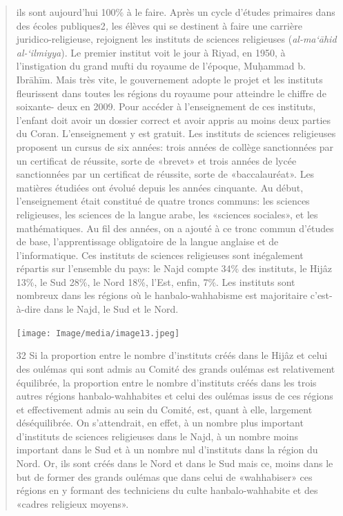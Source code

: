 \begin{quote}
ils sont aujourd'hui 100\% à le faire. Après un cycle d'études primaires
dans des écoles publiques2\emph{,} les élèves qui se destinent à faire
une carrière juridico-religieuse, rejoignent les instituts de sciences
religieuses (\emph{al-ma`āhid al-`ilmiyya}). Le premier institut voit le
jour à Riyad, en 1950, à l'instigation du grand mufti du royaume de
l'époque, Muḥammad b. Ibrāhīm. Mais très vite, le gouvernement adopte le
projet et les instituts fleurissent dans toutes les régions du royaume
pour atteindre le chiffre de soixante- deux en 2009. Pour accéder à
l'enseignement de ces instituts, l'enfant doit avoir un dossier correct
et avoir appris au moins deux parties du Coran. L'enseignement y est
gratuit. Les instituts de sciences religieuses proposent un cursus de
six années: trois années de collège sanctionnées par un certificat de
réussite, sorte de «brevet» et trois années de lycée sanctionnées par un
certificat de réussite, sorte de «baccalauréat». Les matières étudiées
ont évolué depuis les années cinquante. Au début, l'enseignement était
constitué de quatre troncs communs: les sciences religieuses, les
sciences de la langue arabe, les «sciences sociales», et les
mathématiques. Au fil des années, on a ajouté à ce tronc commun d'études
de base, l'apprentissage obligatoire de la langue anglaise et de
l'informatique. Ces instituts de sciences religieuses sont inégalement
répartis sur l'ensemble du pays: le Najd compte 34\% des instituts, le
Hijâz 13\%, le Sud 28\%, le Nord 18\%, l'Est, enfin, 7\%. Les instituts
sont nombreux dans les régions où le hanbalo-wahhabisme est majoritaire
c'est-à-dire dans le Najd, le Sud et le Nord.

\texttt{[image: Image/media/image13.jpeg]}

32 Si la proportion entre le nombre d'instituts créés dans le Hijâz et
celui des oulémas qui sont admis au Comité des grands oulémas est
relativement équilibrée, la proportion entre le nombre d'instituts créés
dans les trois autres régions hanbalo-wahhabites et celui des oulémas
issus de ces régions et effectivement admis au sein du Comité, est,
quant à elle, largement déséquilibrée. On s'attendrait, en effet, à un
nombre plus important d'instituts de sciences religieuses dans le Najd,
à un nombre moins important dans le Sud et à un nombre nul d'instituts
dans la région du Nord. Or, ils sont créés dans le Nord et dans le Sud
mais ce, moins dans le but de former des grands oulémas que dans celui
de «wahhabiser» ces régions en y formant des techniciens du culte
hanbalo-wahhabite et des «cadres religieux moyens».


\end{quote}

